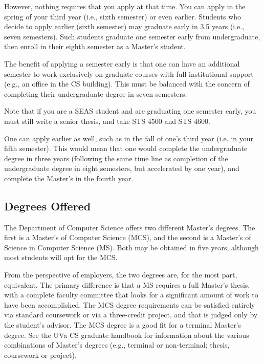 However, nothing requires that you apply at that time.  You can apply
in the spring of your third year (i.e., sixth semester) or even earlier.
Students who decide to apply earlier (sixth semester) may graduate
early in 3.5 years (i.e., seven semesters). Such students graduate one
semester early from undergraduate, then enroll in their eighth semester
as a Master's student.

The benefit of applying a semester early is that one can have an
additional semester to work exclusively on graduate courses with full
institutional support (e.g., an office in the CS building). This must be
balanced with the concern of completing their undergraduate degree in seven
semesters.

Note that if you are a SEAS student and are graduating one semester
early, you must still write a senior thesis, and take STS 4500 and STS
4600.

One can apply earlier as well, such as in the fall of one's third year
(i.e. in your fifth semester).  This would mean that one would complete
the undergraduate degree in three years (following the same time line as
completion of the undergraduate degree in eight semesters, but accelerated
by one year), and complete the Master's in the fourth year.

\subsection{Degrees Offered}

The Department of Computer Science offers two different Master's
degrees.  The first is a Master's of Computer Science (MCS), and the
second is a Master's of Science in Computer Science (MS). Both may be
obtained in five years, although most students will opt for the MCS.

From the perspective of employers, the two degrees are, for the most part,
equivalent.  The primary difference is that a MS requires a full
Master's thesis, with a complete faculty committee that looks for a
significant amount of work to have been accomplished.  The MCS degree
requirements can be satisfied entirely via standard coursework or via
a three-credit project, and that is judged only by the student's advisor.
The MCS degree is a good fit for a terminal Master's degree. See the
UVa CS graduate handbook for information about the various combinations
of Master's degrees (e.g., terminal or non-terminal; thesis, coursework or
project). 


